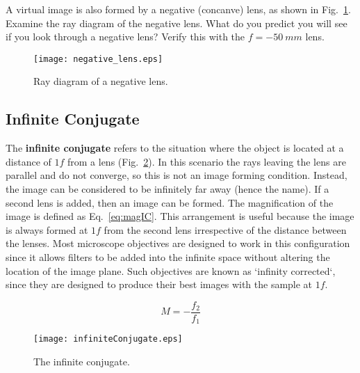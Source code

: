 \documentclass[a4paper]{report}
\begin{document}
A virtual image is also formed by a negative (concanve) lens, as shown in Fig.~\ref{fig:neglens}. 
Examine the ray diagram of the negative lens. 
What do you predict you will see if you look through a negative lens?
Verify this with the $f=-50~mm$ lens.
\begin{figure}[h]
\center
\texttt{[image: negative\_lens.eps]}
\caption{Ray diagram of a negative lens.}
\label{fig:neglens}
\end{figure}


\clearpage

\subsection{Infinite Conjugate}
The \textbf{infinite conjugate} refers to the situation where the object is located at a distance of $1f$ from a lens (Fig.~\ref{infiniteConjugate}). 
In this scenario the rays leaving the lens are parallel and do not converge, so this is not an image forming condition. 
Instead, the image can be considered to be infinitely far away (hence the name). 
If a second lens is added, then an image can be formed. 
The magnification of the image is defined as Eq.~\ref{eq:magIC}. 
This arrangement is useful because the image is always formed at $1f$ from the second lens irrespective of the distance between the lenses.
Most microscope objectives are designed to work in this configuration since it allows filters to be added into the infinite space without altering the location of the image plane. 
Such objectives are known as `infinity corrected`, since they are designed to produce their best images with the sample at $1f$.

\begin{equation}
M=-\frac{f_2}{f_1}
\label{eq:magIC}
\end{equation}

\begin{figure}[h]
\center
\texttt{[image: infiniteConjugate.eps]}
\caption{The infinite conjugate.}
\label{infiniteConjugate}
\end{figure}
\end{document}
